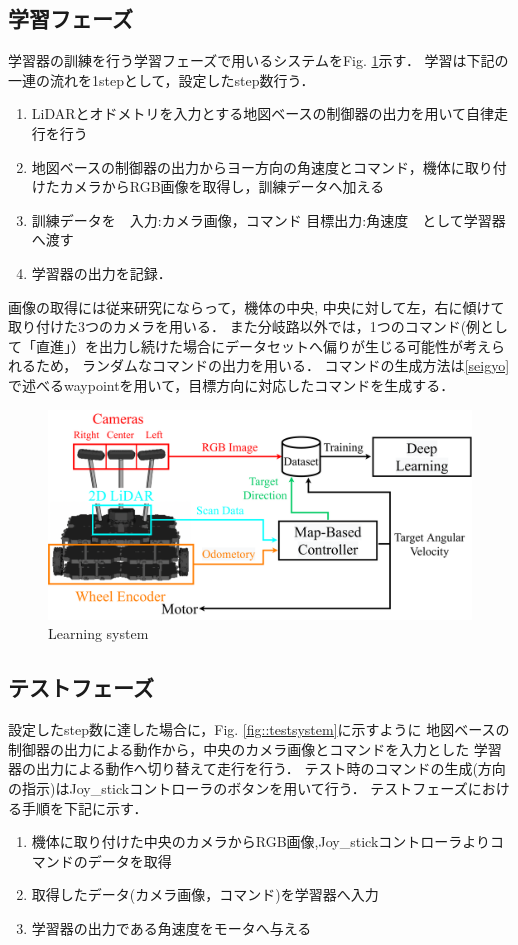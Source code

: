 \subsection{学習フェーズ}
\label{lerning}
学習器の訓練を行う学習フェーズで用いるシステムをFig. \ref{fig::learningsystem}示す．
学習は下記の一連の流れを1stepとして，設定したstep数行う．
\begin{enumerate}
    \item LiDARとオドメトリを入力とする地図ベースの制御器の出力を用いて自律走行を行う
    \item 地図ベースの制御器の出力からヨー方向の角速度とコマンド，機体に取り付けたカメラからRGB画像を取得し，訓練データへ加える
    \item 訓練データを　入力:カメラ画像，コマンド 目標出力:角速度　として学習器へ渡す
    \item 学習器の出力を記録．
  \end{enumerate}
画像の取得には従来研究\cite{okada}にならって，機体の中央, 中央に対して左，右に傾けて取り付けた3つのカメラを用いる．
また分岐路以外では，1つのコマンド(例として「直進」）を出力し続けた場合にデータセットへ偏りが生じる可能性が考えられるため，
ランダムなコマンドの出力を用いる．
コマンドの生成方法は\ref{seigyo}で述べるwaypointを用いて，目標方向に対応したコマンドを生成する．

\begin{figure}[H]
    \centering
    \includegraphics[width = 12cm]{./figs/system_learning.pdf}
    \caption{Learning system }
    \label{fig::learningsystem}
\end{figure}


\newpage
\subsection{テストフェーズ}
\label{test}
設定したstep数に達した場合に，Fig. \ref{fig::testsystem}に示すように
地図ベースの制御器の出力による動作から，中央のカメラ画像とコマンドを入力とした
学習器の出力による動作へ切り替えて走行を行う．
テスト時のコマンドの生成(方向の指示)はJoy\_stickコントローラのボタンを用いて行う．
テストフェーズにおける手順を下記に示す．
\begin{enumerate}
    \item 機体に取り付けた中央のカメラからRGB画像,Joy\_stickコントローラよりコマンドのデータを取得
    \item 取得したデータ(カメラ画像，コマンド)を学習器へ入力
    \item 学習器の出力である角速度をモータへ与える
  \end{enumerate}


